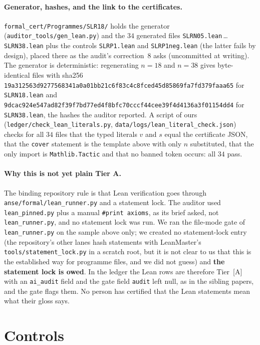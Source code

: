 \documentclass[10pt]{article}
\newcommand{\tier}[1]{\textsf{[#1]}}
\newcommand{\tA}{\tier{A}}
\newcommand{\lean}[1]{\texttt{#1}}
\begin{document}
\paragraph{Generator, hashes, and the link to the certificates.} \texttt{formal\_cert/Programmes/SLR18/} holds the generator (\texttt{auditor\_tools/gen\_lean.py}) and the $34$ generated files \texttt{SLRN05.lean}\,\dots\,\texttt{SLRN38.lean} plus the controls \texttt{SLRP1.lean} and \texttt{SLRP1neg.lean} (the latter fails by design), placed there as the audit's correction~8 asks (uncommitted at writing). The generator is deterministic: regenerating $n=18$ and $n=38$ gives byte-identical files with sha256 \texttt{19a312563d9277568341a0a01bb21c6f83c4c8fced45d85869fa7fd379faaa65} for \texttt{SLRN18.lean} and \texttt{9dcac924e547ad82f39f7bd77ed4f8bfc70cccf44cee39f4d4136a3f01154dd4} for \texttt{SLRN38.lean}, the hashes the auditor reported. A script of ours (\texttt{ledger/check\_lean\_literals.py}, \texttt{data/logs/lean\_literal\_check.json}) checks for all $34$ files that the typed literals $v$ and $s$ equal the certificate JSON, that the \lean{cover} statement is the template above with only $n$ substituted, that the only import is \texttt{Mathlib.Tactic} and that no banned token occurs: all $34$ pass.
\paragraph{Why this is not yet plain Tier A.} The binding repository rule is that Lean verification goes through \texttt{anse/formal/lean\_runner.py} and a statement lock. The auditor used \texttt{lean\_pinned.py} plus a manual \texttt{\#print axioms}, as its brief asked, not \texttt{lean\_runner.py}, and no statement lock was run. We ran the file-mode gate of \texttt{lean\_runner.py} on the sample above only; we created no statement-lock entry (the repository's other lanes hash statements with LeanMaster's \texttt{tools/statement\_lock.py} in a scratch root, but it is not clear to us that this is the established way for programme files, and we did not guess) and \textbf{the statement lock is owed}. In the ledger the Lean rows are therefore Tier~\tA{} with an \texttt{ai\_audit} field and the gate field \texttt{audit} left null, as in the sibling papers, and the gate flags them. No person has certified that the Lean statements mean what their gloss says.

\section{Controls}\label{sec:controls}
\end{document}
